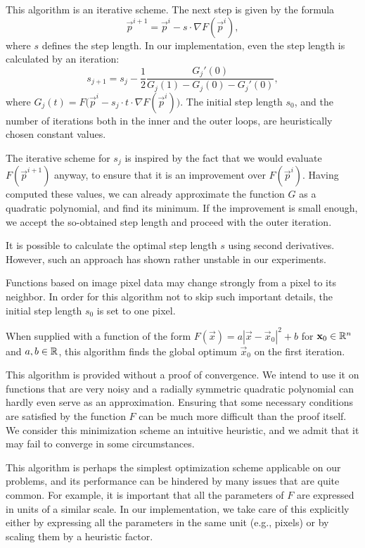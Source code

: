 This algorithm is an iterative scheme.
The next step is given by the formula
$$\vec p^{i+1} = \vec p^i - s \cdot \nabla F(\vec p^i),$$
where $s$ defines the step length.
In our implementation, even the step length is calculated by an iteration:
$$s_{j+1} = s_j - \frac 1 2 \frac {G_j'(0)} {G_j(1) - G_j(0) - G_j'(0)},$$
where $G_j(t) = F \big( \vec p^i - s_j \cdot t \cdot \nabla F(\vec p^i) \big)$.
The initial step length $s_0$, and the number of iterations both in the inner and the outer loops, are heuristically chosen constant values.

The iterative scheme for $s_j$ is inspired by the fact that we would evaluate $F(\vec p^{i+1})$ anyway, to ensure that it is an improvement over $F(\vec p^i)$.
Having computed these values, we can already approximate the function $G$ as a quadratic polynomial, and find its minimum.
If the improvement is small enough, we accept the so-obtained step length and proceed with the outer iteration.

It is possible to calculate the optimal step length $s$ using second derivatives.
However, such an approach has shown rather unstable in our experiments.

Functions based on image pixel data may change strongly from a pixel to its neighbor.
In order for this algorithm not to skip such important details, the initial step length $s_0$ is set to one pixel.

\begin{claim}
When supplied with a function of the form $F(\vec x) = a|\vec x - \vec x_0|^2 + b$ for $\mathbf{x}_0 \in \mathbb{R}^n$ and $a, b \in \mathbb{R}$, this algorithm finds the global optimum $\vec x_0$ on the first iteration.
\end{claim}
This algorithm is provided without a proof of convergence.
We intend to use it on functions that are very noisy and a radially symmetric quadratic polynomial can hardly even serve as an approximation.
Ensuring that some necessary conditions are satisfied by the function $F$ can be much more difficult than the proof itself.
We consider this minimization scheme an intuitive heuristic, and we admit that it may fail to converge in some circumstances.

This algorithm is perhaps the simplest optimization scheme applicable on our problems, and its performance can be hindered by many issues that are quite common.
For example, it is important that all the parameters of $F$ are expressed in units of a similar scale.
In our implementation, we take care of this explicitly either by expressing all the parameters in the same unit (e.g., pixels) or by scaling them by a heuristic factor.

